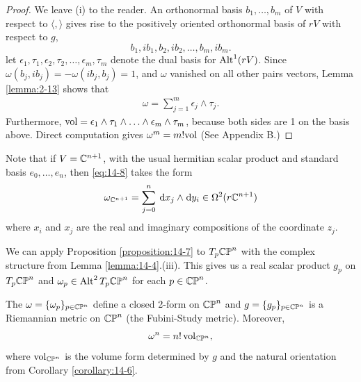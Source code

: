 \begin{proof}
  We leave (i) to the reader. An orthonormal basis $b_1, \ldots, b_m$ of $V$ with
  respect to $\langle,\rangle$ gives rise to the positively oriented orthonormal basis of $rV$ with
  respect to $g$,
  \[
    b_1, ib_1, b_2, ib_2, \ldots, b_m, ib_m.
  \]
  let $\epsilon_1, \tau_1, \epsilon_2, \tau_2, \ldots, \epsilon_m, \tau_m$ denote the dual basis for $\operatorname{Alt}^1(rV)$.
  Since $\omega(b_j, ib_j)=-\omega(ib_j, b_j)=1$, and $\omega$ vanished on all other pairs vectors, Lemma \ref{lemma:2-13}
  shows that 
  \begin{align}\label{eq:14-8}
    \omega = \sum_{j=1}^{m }{\epsilon_j\wedge\tau_j}.
  \end{align}
  Furthermore, $\mathrm{vol}=\epsilon_1\wedge\tau_1\wedge\ldots\wedge\epsilon_m\wedge\tau_m$, because both sides are 1 on 
  the basis above. Direct computation gives $\omega^m=m!\mathrm{vol}$ (See Appendix B.)
\end{proof}

Note that if $V={\mathbb{C}}^{n+1}$, with the usual hermitian scalar product and standard basis
$e_0, \ldots, e_n$, then \eqref{eq:14-8} takes the form
\begin{align}\label{eq:14-9}
  \omega_{\CC^{n+1}} = \sum_{j=0}^{n }{\dd x_j \wedge\!\dd y_i}\in\Omega^2(r\CC^{n+1})
\end{align}
where $x_i$ and $x_j$ are the real and imaginary compositions of the coordinate $z_j$.

We can apply Proposition \ref{proposition:14-7} to $T_p\mathbb{CP}^n$ with the complex structure from Lemma
\ref{lemma:14-4}.(iii). This gives us a real scalar product $g_p$ on $T_p\mathbb{CP}^n$ and $\omega_p\in\operatorname{Alt}^2T_p\mathbb{CP}^n$
for each $p\in \mathbb{CP}^n$.

\begin{theorem}\label{theorem:14-8}
  The $\omega=\{\omega_p\}_{p\in\mathbb{CP}^n}$ define a closed 2-form on $\mathbb{CP}^n$ and $g=\{g_p\}_{p\in\mathbb{CP}^n}$ is a 
  Riemannian metric on $\mathbb{CP}^n$ (the Fubini-Study metric). Moreover,
  \[
    \omega^n = n!\,\mathrm{vol}_{\mathbb{CP}^n},
  \]
  where $\mathrm{vol}_{\mathbb{CP}^n}$ is the volume form determined by $g$ and the natural orientation 
  from Corollary \ref{corollary:14-6}.
\end{theorem}

